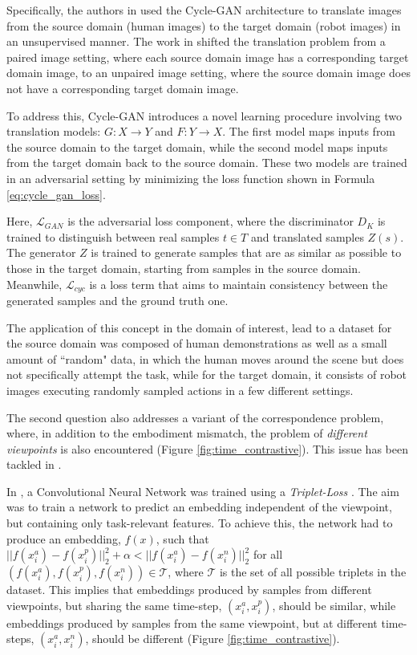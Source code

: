 Specifically, the authors in \cite{smith2019avid, xiong2021learning_by_watching} used the Cycle-GAN architecture \cite{zhu2017cycle_gan} to translate images from the source domain (human images) to the target domain (robot images) in an unsupervised manner. The work in \cite{zhu2017cycle_gan} shifted the translation problem from a paired image setting, where each source domain image has a corresponding target domain image, to an unpaired image setting, where the source domain image does not have a corresponding target domain image.

To address this, Cycle-GAN introduces a novel learning procedure involving two translation models: $G: X \rightarrow Y$ and $F: Y \rightarrow X$. The first model maps inputs from the source domain to the target domain, while the second model maps inputs from the target domain back to the source domain. These two models are trained in an adversarial setting by minimizing the loss function shown in Formula \ref{eq:cycle_gan_loss}.

Here, $\mathcal{L}_{GAN}$ is the adversarial loss component, where the discriminator $D_{K}$ is trained to distinguish between real samples $t \in T$ and translated samples $Z(s)$. The generator $Z$ is trained to generate samples that are as similar as possible to those in the target domain, starting from samples in the source domain. Meanwhile, $\mathcal{L}_{cyc}$ is a loss term that aims to maintain consistency between the generated samples and the ground truth one.

The application of this concept in the domain of interest, lead to a dataset for the source domain was composed of human demonstrations as well as a small amount of ``random" data, in which the human moves around the scene but does not specifically attempt the task, while for the target domain, it consists of robot images executing randomly sampled actions in a few different settings.

The second question also addresses a variant of the correspondence problem, where, in addition to the embodiment mismatch, the problem of \textit{different viewpoints} is also encountered (Figure \ref{fig:time_contrastive}). This issue has been tackled in \cite{sermanet2018time_contrastive, liu2018imitation_from_observation}.

In \cite{sermanet2018time_contrastive}, a Convolutional Neural Network was trained using a \textit{Triplet-Loss} \cite{schroff2015triplet_loss}. The aim was to train a network to predict an embedding independent of the viewpoint, but containing only task-relevant features. To achieve this, the network had to produce an embedding, $f(x)$, such that $|| f(x^{a}_{i}) - f(x^{p}_{i})||^{2}_{2} + \alpha < || f(x^{a}_{i}) - f(x^{n}_{i})||^{2}_{2}$ for all $(f(x^{a}_{i}), f(x^{p}_{i}), f(x^{n}_{i})) \in \mathcal{T}$, where $\mathcal{T}$ is the set of all possible triplets in the dataset. This implies that embeddings produced by samples from different viewpoints, but sharing the same time-step, $(x^{a}_{i},x^{p}_{i})$, should be similar, while embeddings produced by samples from the same viewpoint, but at different time-steps, $(x^{a}_{i},x^{n}_{i})$, should be different (Figure \ref{fig:time_contrastive}).

